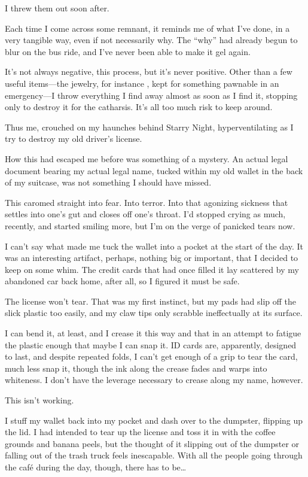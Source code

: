 I threw them out soon after.

Each time I come across some remnant, it reminds me of what I've done, in a very tangible way, even if not necessarily why. The ``why'' had already begun to blur on the bus ride, and I've never been able to make it gel again.

It's not always negative, this process, but it's never positive. Other than a few useful items---the jewelry, for instance , kept for something pawnable in an emergency---I throw everything I find away almost as soon as I find it, stopping only to destroy it for the catharsis. It's all too much risk to keep around.

Thus me, crouched on my haunches behind Starry Night, hyperventilating as I try to destroy my old driver's license.

How this had escaped me before was something of a mystery. An actual legal document bearing my actual legal name, tucked within my old wallet in the back of my suitcase, was not something I should have missed.

This caromed straight into fear. Into terror. Into that agonizing sickness that settles into one's gut and closes off one's throat. I'd stopped crying as much, recently, and started smiling more, but I'm on the verge of panicked tears now.

I can't say what made me tuck the wallet into a pocket at the start of the day. It was an interesting artifact, perhaps, nothing big or important, that I decided to keep on some whim. The credit cards that had once filled it lay scattered by my abandoned car back home, after all, so I figured it must be safe.

The license won't tear. That was my first instinct, but my pads had slip off the slick plastic too easily, and my claw tips only scrabble ineffectually at its surface.

I can bend it, at least, and I crease it this way and that in an attempt to fatigue the plastic enough that maybe I can snap it. ID cards are, apparently, designed to last, and despite repeated folds, I can't get enough of a grip to tear the card, much less snap it, though the ink along the crease fades and warps into whiteness. I don't have the leverage necessary to crease along my name, however.

This isn't working.

I stuff my wallet back into my pocket and dash over to the dumpster, flipping up the lid. I had intended to tear up the license and toss it in with the coffee grounds and banana peels, but the thought of it slipping out of the dumpster or falling out of the trash truck feels inescapable. With all the people going through the café during the day, though, there has to be\ldots{}

